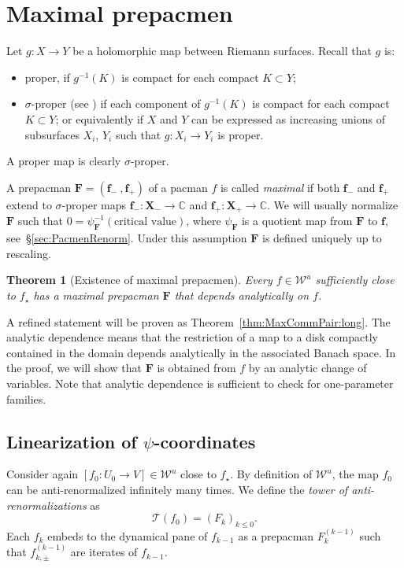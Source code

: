 \documentclass[]{amsart}
\newcommand\TT{\mathcal{T}}
\newcommand{\bF}{{\mathbf F}}
\newcommand{\bX}{{\mathbf X}}
\newcommand{\bbf}{{\mathbf f}}
\newcommand{\str}{{\star}}
\newcommand\WW{\mathcal{W}}
\newcommand{\C}{\mathbb{C}}
\newtheorem{thm}{Theorem}[section]
\theoremstyle{remark}
\numberwithin{equation}{section}
\theoremstyle{definition}
\begin{document}
\section{Maximal prepacmen}
\label{s:MaxComPair}


Let $g : X \to Y$ be a holomorphic map between Riemann surfaces.  
Recall that $g$ is:
\begin{itemize}
\item proper, if $g^{-1}(K)$ is compact for each compact $K \subset Y$;
\item $\sigma$-proper (see \cite[\S 8]{McM3}) if each component of $g^{-1}(K)$ is compact for each compact $K \subset Y$; or equivalently if $X$ and $Y$ can be expressed as increasing unions of subsurfaces $X_i$, $Y_i$ such that $g : X_i \to Y_i$ is proper.
\end{itemize}
\noindent A proper map is clearly $\sigma$-proper.



A prepacman $\bF=(\bbf_-~,\bbf_+)$ of a pacman $f$ is called \emph{maximal} if both $\bbf_-$ and $\bbf_+$ extend to $\sigma$-proper maps $\bbf_-\colon \bX_-\to \C$ and $\bbf_+\colon \bX_+\to \C$. We will usually normalize $\bF$ such that $0=\psi^{-1}_\bF(\text{critical value})$, where $\psi_\bF$ is a quotient map from $\bF$ to $\bbf$, see~\S\ref{sec:PacmenRenorm}. Under this assumption $\bF$ is defined uniquely up to rescaling.  
 





\begin{thm}[Existence of  maximal prepacmen]
\label{thm:MaxCommPair:short}
Every $f\in \WW^u$ sufficiently close to $f_\str$ has a maximal prepacman $\bF$ that depends analytically on $f$. 
 \end{thm}
 \noindent A refined statement will be proven as Theorem~\ref{thm:MaxCommPair:long}. The analytic dependence means that the restriction of a map to a disk compactly contained in the domain depends analytically in the associated Banach space. In the proof, we will show that $\bF$ is obtained from $f$ by an analytic change of variables. Note that analytic dependence is sufficient to check for one-parameter families. 
 
 



\subsection{Linearization of $\psi$-coordinates}
Consider again $[f_0\colon U_0\to V]\in \WW^u$ close to $f_\str$. By definition of $\WW^u$, the map $f_0$ can be anti-renormalized infinitely many times. We define the \emph{tower of anti-renormalizations} as 
\[\TT(f_0) =  \left(F_k\right)_{k\le 0}.\]
Each $f_k$ embeds to the dynamical pane of $f_{k-1}$ as a prepacman  $F_{k}^{(k-1)}$ such that $f_{k,\pm}^{(k-1)}$ are iterates of $f_{k-1}$. 
\end{document}
